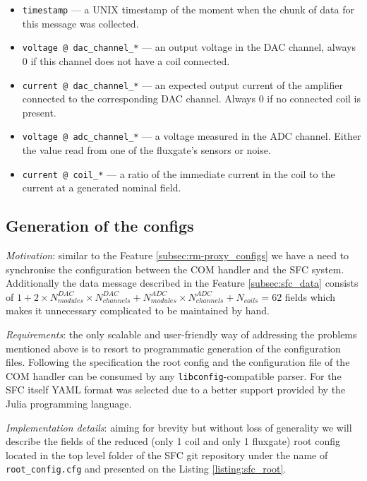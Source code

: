 \begin{itemize}
	\item \texttt{timestamp} --- a UNIX timestamp of the moment when the chunk of data for this message was collected.
	\item \texttt{voltage @ dac\_channel\_*} --- an output voltage in the DAC channel, always 0 if this channel does not have a coil connected.
	\item \texttt{current @ dac\_channel\_*} --- an expected output current of the amplifier connected to the corresponding DAC channel. Always 0 if no connected coil is present.
	\item \texttt{voltage @ adc\_channel\_*} --- a voltage measured in the ADC channel. Either the value read from one of the fluxgate's sensors or noise.
	\item \texttt{current @ coil\_*} --- a ratio of the immediate current in the coil to the current at a generated nominal field.
\end{itemize}

\subsection{Generation of the configs}
\label{subsec:sfc_configs}


\textit{Motivation}: similar to the Feature \ref{subsec:rm-proxy_configs} we have a need to synchronise the configuration between the COM handler and the SFC system. Additionally the data message described in the Feature \ref{subsec:sfc_data} consists of $1 + 2 \times N_{modules}^{DAC} \times N_{channels}^{DAC} + N_{modules}^{ADC} \times N_{channels}^{ADC} + N_{coils} = 62$ fields which makes it unnecessary complicated to be maintained by hand.

\textit{Requirements}: the only scalable and user-friendly way of addressing the problems mentioned above is to resort to programmatic generation of the configuration files. Following the specification \cite{Bison2018} the root config and the configuration file of the COM handler can be consumed by any \texttt{libconfig}-compatible parser. For the SFC itself YAML format was selected due to a better support provided by the Julia programming language.

\textit{Implementation details}: aiming for brevity but without loss of generality we will describe the fields of the reduced (only 1 coil and only 1 fluxgate) root config located in the top level folder of the SFC git repository under the name of \texttt{root\_config.cfg} and presented on the Listing \ref{listing:sfc_root}.

